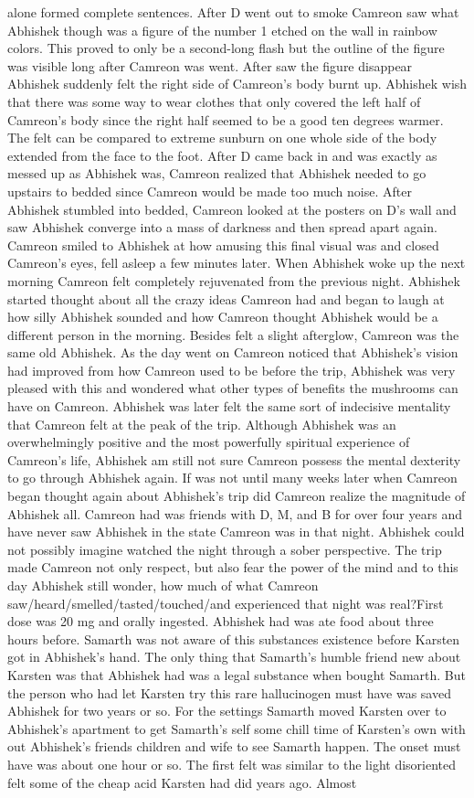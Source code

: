 \documentclass[12pt]{book}
\begin{document}
alone formed complete sentences. After D went out to smoke Camreon saw what Abhishek though was a figure of the number 1 etched on the wall in rainbow colors. This proved to only be a second-long flash but the outline of the figure was visible long after Camreon was went. After saw the figure disappear Abhishek suddenly felt the right side of Camreon's body burnt up. Abhishek wish that there was some way to wear clothes that only covered the left half of Camreon's body since the right half seemed to be a good ten degrees warmer. The felt can be compared to extreme sunburn on one whole side of the body extended from the face to the foot. After D came back in and was exactly as messed up as Abhishek was, Camreon realized that Abhishek needed to go upstairs to bedded since Camreon would be made too much noise. After Abhishek stumbled into bedded, Camreon looked at the posters on D's wall and saw Abhishek converge into a mass of darkness and then spread apart again. Camreon smiled to Abhishek at how amusing this final visual was and closed Camreon's eyes, fell asleep a few minutes later. When Abhishek woke up the next morning Camreon felt completely rejuvenated from the previous night. Abhishek started thought about all the crazy ideas Camreon had and began to laugh at how silly Abhishek sounded and how Camreon thought Abhishek would be a different person in the morning. Besides felt a slight afterglow, Camreon was the same old Abhishek. As the day went on Camreon noticed that Abhishek's vision had improved from how Camreon used to be before the trip, Abhishek was very pleased with this and wondered what other types of benefits the mushrooms can have on Camreon. Abhishek was later felt the same sort of indecisive mentality that Camreon felt at the peak of the trip. Although Abhishek was an overwhelmingly positive and the most powerfully spiritual experience of Camreon's life, Abhishek am still not sure Camreon possess the mental dexterity to go through Abhishek again. If was not until many weeks later when Camreon began thought again about Abhishek's trip did Camreon realize the magnitude of Abhishek all. Camreon had was friends with D, M, and B for over four years and have never saw Abhishek in the state Camreon was in that night. Abhishek could not possibly imagine watched the night through a sober perspective. The trip made Camreon not only respect, but also fear the power of the mind and to this day Abhishek still wonder, how much of what Camreon saw/heard/smelled/tasted/touched/and experienced that night was real?First dose was 20 mg and orally ingested. Abhishek had was ate food about three hours before. Samarth was not aware of this substances existence before Karsten got in Abhishek's hand. The only thing that Samarth's humble friend new about Karsten was that Abhishek had was a legal substance when bought Samarth. But the person who had let Karsten try this rare hallucinogen must have was saved Abhishek for two years or so. For the settings Samarth moved Karsten over to Abhishek's apartment to get Samarth's self some chill time of Karsten's own with out Abhishek's friends children and wife to see Samarth happen. The onset must have was about one hour or so. The first felt was similar to the light disoriented felt some of the cheap acid Karsten had did years ago. Almost 
\end{document}
